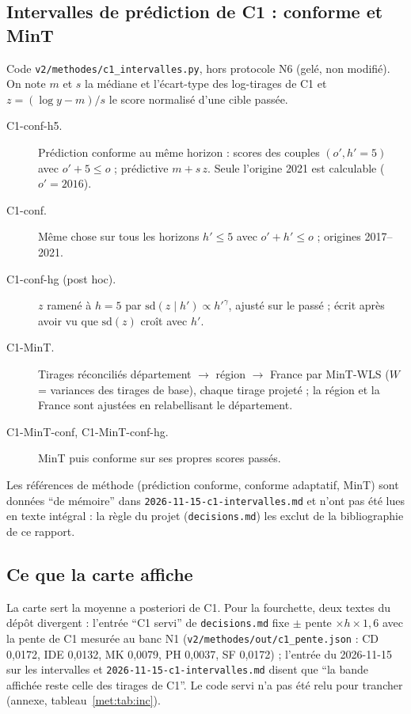 \subsection{Intervalles de prédiction de C1 : conforme et MinT}
\label{met:intervalles}
Code \texttt{v2/methodes/c1\_intervalles.py}, hors protocole N6 (gelé, non modifié). On note $m$ et $s$ la
médiane et l'écart-type des log-tirages de C1 et $z = (\log y - m)/s$ le score normalisé d'une cible
passée.
\begin{description}
  \item[C1-conf-h5.] Prédiction conforme au même horizon : scores des couples $(o', h' = 5)$ avec
    $o' + 5 \le o$ ; prédictive $m + s\,z$. Seule l'origine 2021 est calculable ($o' = 2016$).
  \item[C1-conf.] Même chose sur tous les horizons $h' \le 5$ avec $o' + h' \le o$ ; origines 2017--2021.
  \item[C1-conf-hg (post hoc).] $z$ ramené à $h = 5$ par $\mathrm{sd}(z \mid h') \propto h'^{\gamma}$, ajusté
    sur le passé ; écrit après avoir vu que $\mathrm{sd}(z)$ croît avec $h'$.
  \item[C1-MinT.] Tirages réconciliés département $\to$ région $\to$ France par MinT-WLS ($W$ = variances des
    tirages de base), chaque tirage projeté ; la région et la France sont ajustées en relabellisant le
    département.
  \item[C1-MinT-conf, C1-MinT-conf-hg.] MinT puis conforme sur ses propres scores passés.
\end{description}
Les références de méthode (prédiction conforme, conforme adaptatif, MinT) sont données \enquote{de mémoire}
dans \texttt{2026-11-15-c1-intervalles.md} et n'ont pas été lues en texte intégral : la règle du projet
(\texttt{decisions.md}) les exclut de la bibliographie de ce rapport.

\subsection{Ce que la carte affiche}
\label{met:servi}
La carte sert la moyenne a posteriori de C1. Pour la fourchette, deux textes du dépôt divergent : l'entrée
\enquote{C1 servi} de \texttt{decisions.md} fixe $\pm$ pente $\times h \times 1{,}6$ avec la pente de C1
mesurée au banc N1 (\texttt{v2/methodes/out/c1\_pente.json} : CD 0,0172\mesure, IDE 0,0132\mesure,
MK 0,0079\mesure, PH 0,0037\mesure, SF 0,0172\mesure) ; l'entrée du 2026-11-15 sur les intervalles et
\texttt{2026-11-15-c1-intervalles.md} disent que \enquote{la bande affichée reste celle des tirages de
C1}. Le code servi n'a pas été relu pour trancher (annexe, tableau~\ref{met:tab:inc}).

